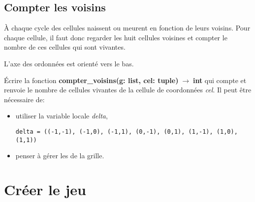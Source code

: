 \documentclass[a4paper,11pt]{article}
\begin{document}
\begin{Form}
\subsection{Compter les voisins}
À chaque cycle des cellules naissent ou meurent en fonction de leurs voisins. Pour chaque cellule, il faut donc regarder les huit cellules voisines et compter le nombre de ces cellules qui sont vivantes.
\begin{center}
L'axe des ordonnées est orienté vers le bas.
\label{coord}
\end{center}
\begin{activite}
Écrire la fonction \textbf{compter\_voisins(g: list, cel: tuple)$\;\rightarrow\;$int} qui compte et renvoie le nombre de cellules vivantes de la cellule de coordonnées \emph{cel}. Il peut être nécessaire de:
\begin{itemize}
\item utiliser la variable locale \emph{delta},
\begin{lstlisting}[xleftmargin=2em,xrightmargin=1.5em]
delta = ((-1,-1), (-1,0), (-1,1), (0,-1), (0,1), (1,-1), (1,0), (1,1))
\end{lstlisting}
\item penser à gérer les  de la grille.
\end{itemize} 
\end{activite}
\section{Créer le jeu}

\end{Form}
\end{document}
